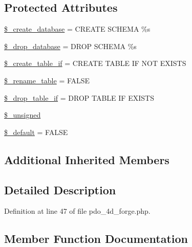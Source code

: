 \subsection*{Protected Attributes}
\begin{DoxyCompactItemize}
\item 
\mbox{\hyperlink{class_c_i___d_b__pdo__4d__forge_acd23c9a8735806155f1a5d0a87c151f2}{\$\+\_\+create\+\_\+database}} = \textquotesingle{}C\+R\+E\+A\+TE S\+C\+H\+E\+MA \%s\textquotesingle{}
\item 
\mbox{\hyperlink{class_c_i___d_b__pdo__4d__forge_a8305b12fc17f6f87778260ebdff287b4}{\$\+\_\+drop\+\_\+database}} = \textquotesingle{}D\+R\+OP S\+C\+H\+E\+MA \%s\textquotesingle{}
\item 
\mbox{\hyperlink{class_c_i___d_b__pdo__4d__forge_a2f6484fcb8d1dc3eef67a637227cd583}{\$\+\_\+create\+\_\+table\+\_\+if}} = \textquotesingle{}C\+R\+E\+A\+TE T\+A\+B\+LE IF N\+OT E\+X\+I\+S\+TS\textquotesingle{}
\item 
\mbox{\hyperlink{class_c_i___d_b__pdo__4d__forge_a1a649e7cf9de16bcf932977b18bc91de}{\$\+\_\+rename\+\_\+table}} = F\+A\+L\+SE
\item 
\mbox{\hyperlink{class_c_i___d_b__pdo__4d__forge_a92a8a9145a7fc91e252e58d019373581}{\$\+\_\+drop\+\_\+table\+\_\+if}} = \textquotesingle{}D\+R\+OP T\+A\+B\+LE IF E\+X\+I\+S\+TS\textquotesingle{}
\item 
\mbox{\hyperlink{class_c_i___d_b__pdo__4d__forge_aae977ae6d61fa183f0b25422b6ddc31c}{\$\+\_\+unsigned}}
\item 
\mbox{\hyperlink{class_c_i___d_b__pdo__4d__forge_aa119e1b4e3d00f47a7b83b7066087915}{\$\+\_\+default}} = F\+A\+L\+SE
\end{DoxyCompactItemize}
\subsection*{Additional Inherited Members}


\subsection{Detailed Description}


Definition at line 47 of file pdo\+\_\+4d\+\_\+forge.\+php.



\subsection{Member Function Documentation}
\mbox{\label{class_c_i___d_b__pdo__4d__forge_a41c6cae02f2fda8b429ad0afb9509426}} 
